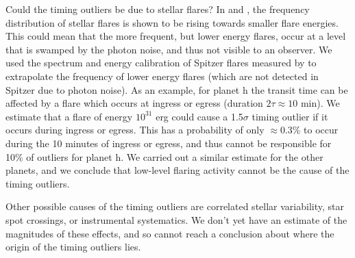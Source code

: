\documentclass[twocolumn]{aastex63}
\begin{document}
Could the timing outliers be due to stellar flares?  In \citet{Vida_2017} and \citet{Ducrot2020}, the frequency distribution of stellar flares is shown to be rising towards smaller flare energies.  This could mean that the more frequent, but lower energy flares, occur at a level that is swamped by the photon noise, and thus not visible to an observer.  We used the spectrum and energy calibration of Spitzer flares measured by \citet{Ducrot2020} to extrapolate the frequency of lower energy flares (which are not detected in Spitzer due to photon noise).  As an example, for planet h the transit time can be affected by a flare which occurs at ingress or egress (duration $2\tau \approx 10$ min).  %
We estimate that a flare of energy $10^{31}$ erg could cause a 1.5$\sigma$
timing outlier if it occurs during ingress or egress.  This has a probability of only $\approx 0.3$\% to occur during the 10 minutes of ingress or egress,
and thus cannot be responsible for 10\% of outliers for planet h.  We carried out a similar estimate for
the other planets, and we conclude that low-level flaring activity cannot be the cause of the timing outliers.

Other possible causes of the timing outliers are correlated stellar variability, star spot crossings, or instrumental systematics.  We don't yet have an estimate of the magnitudes of these effects, and so cannot reach a conclusion about where the origin of the timing outliers lies.




\end{document}

